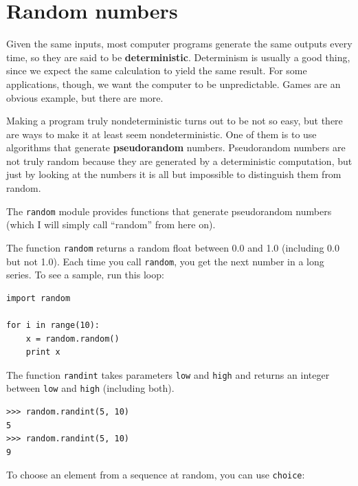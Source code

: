 \documentclass[10pt]{book}
\begin{document}
\section{Random numbers}


Given the same inputs, most computer programs generate the same
outputs every time, so they are said to be {\bf deterministic}.
Determinism is usually a good thing, since we expect the same
calculation to yield the same result.  For some applications, though,
we want the computer to be unpredictable.  Games are an obvious
example, but there are more.

Making a program truly nondeterministic turns out to be not so easy,
but there are ways to make it at least seem nondeterministic.  One of
them is to use algorithms that generate {\bf pseudorandom} numbers.
Pseudorandom numbers are not truly random because they are generated
by a deterministic computation, but just by looking at the numbers it
is all but impossible to distinguish them from random.


The {\tt random} module provides functions that generate
pseudorandom numbers (which I will simply call ``random'' from
here on).


The function {\tt random} returns a random float
between 0.0 and 1.0 (including 0.0 but not 1.0).  Each time you
call {\tt random}, you get the next number in a long series.  To see a
sample, run this loop:

\beforeverb
\begin{verbatim}
import random

for i in range(10):
    x = random.random()
    print x
\end{verbatim}
\afterverb
%
The function {\tt randint} takes parameters {\tt low} and
{\tt high} and returns an integer between {\tt low} and
{\tt high} (including both).


\beforeverb
\begin{verbatim}
>>> random.randint(5, 10)
5
>>> random.randint(5, 10)
9
\end{verbatim}
\afterverb
%
To choose an element from a sequence at random, you can use
{\tt choice}:
\end{document}
